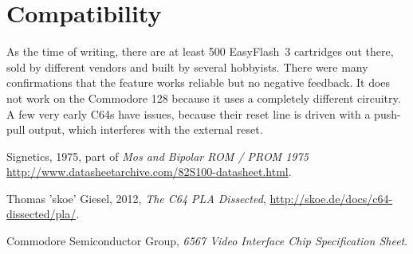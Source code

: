 \documentclass[a4paper,oneside]{memoir}
\begin{document}
\section{Compatibility}

As the time of writing, there are at least 500 EasyFlash~3 cartridges out there, sold by different vendors and built by several hobbyists.
There were many confirmations that the feature works reliable but no negative feedback.
It does not work on the Commodore 128 because it uses a completely different circuitry.
A few very early C64s have issues, because their reset line is driven with a push-pull output, which interferes with the external reset.

\begin{thebibliography}{999}

 Signetics, 1975, part of \textit{Mos and Bipolar ROM / PROM 1975}
\url{http://www.datasheetarchive.com/82S100-datasheet.html}.

 Thomas 'skoe' Giesel, 2012, \textit{The C64 PLA Dissected},
\url{http://skoe.de/docs/c64-dissected/pla/}.

 Commodore Semiconductor Group, \textit{6567 Video Interface Chip Specification Sheet}.

\end{thebibliography}
\end{document}
